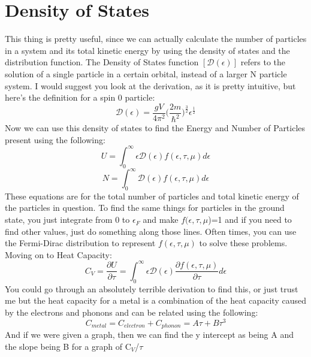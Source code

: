 \documentclass[arial]{article}
\begin{document}
\section*{Density of States}
This thing is pretty useful, since we can actually calculate the number of particles in a system and its total kinetic energy by using the density of states and the distribution function. The Density of States function $[\mathcal{D}(\epsilon)]$ refers to the solution of a single particle in a certain orbital, instead of a larger N particle system. I would suggest you look at the derivation, as it is pretty intuitive, but here's the definition for a spin 0 particle:
\begin{equation}
\mathcal{D}(\epsilon)=\frac{gV}{4\pi^2}\bigg(\frac{2m}{\hbar^2}\bigg)^\frac{3}{2}\epsilon^\frac{1}{2}
\end{equation}
Now we can use this density of states to find the Energy and Number of Particles present using the following:
\begin{equation}
U=\int_{0}^{\infty}\epsilon \mathcal{D}(\epsilon) f(\epsilon,\tau,\mu) d\epsilon
\end{equation}
\begin{equation}
N=\int_{0}^{\infty}\mathcal{D}(\epsilon) f(\epsilon,\tau,\mu) d\epsilon
\end{equation}
These equations are for the total number of particles and total kinetic energy of the particles in question. To find the same things for particles in the ground state, you just integrate from 0 to $\epsilon_F$ and make $f(\epsilon,\tau,\mu$)=1 and if you need to find other values, just do something along those lines. Often times, you can use the Fermi-Dirac distribution to represent $f(\epsilon,\tau,\mu)$ to solve these problems. Moving on to Heat Capacity:
\begin{equation}
C_V=\frac{\partial U}{\partial \tau}=\int_{0}^{\infty}\epsilon \mathcal{D}(\epsilon) \frac{\partial f(\epsilon,\tau,\mu)}{\partial \tau} d\epsilon
\end{equation}
You could go through an absolutely terrible derivation to find this, or just trust me but the heat capacity for a metal is a combination of the heat capacity caused by the electrons and phonons and can be related using the following:
\begin{equation}
C_{metal}=C_{electron}+C_{phonon}=A\tau + B\tau^3
\end{equation}
And if we were given a graph, then we can find the y intercept as being A and the slope being B for a graph of C$_V$/$\tau$
\end{document}
